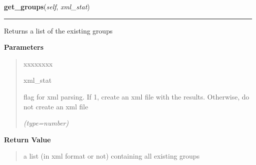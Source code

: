 \hspace{.8\funcindent}\begin{boxedminipage}{\funcwidth}

    \raggedright \textbf{get\_groups}(\textit{self}, \textit{xml\_stat})

    \vspace{-1.5ex}

    \rule{\textwidth}{0.5\fboxrule}
\setlength{\parskip}{2ex}
    Returns a list of the existing groups

\setlength{\parskip}{1ex}
      \textbf{Parameters}
      \vspace{-1ex}

      \begin{quote}
        \begin{Ventry}{xxxxxxxx}

          \item[xml\_stat]

          flag for xml parsing. If 1, create an xml file with the results. 
          Otherwise, do not create an xml file

            {\it (type=number)}

        \end{Ventry}

      \end{quote}

      \textbf{Return Value}
    \vspace{-1ex}

      \begin{quote}
      a list (in xml format or not) containing all existing groups

      \end{quote}

    \end{boxedminipage}

    \label{DBE:DBE:get_group_name}

    \vspace{0.5ex}

